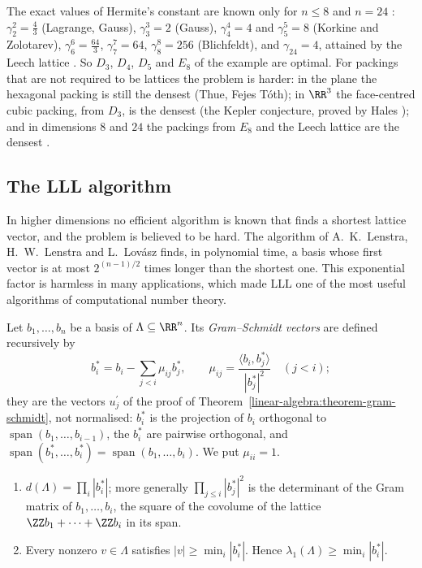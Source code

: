 \begin{remark}\label{geometry-of-numbers:remark-hermite-values}
The exact values of Hermite's constant are known only for $n \leq 8$ and $n = 24$ \cite{conway-sloane}: $\gamma_2^2 = \frac43$ (Lagrange, Gauss), $\gamma_3^3 = 2$ (Gauss), $\gamma_4^4 = 4$ and
$\gamma_5^5 = 8$ (Korkine and Zolotarev), $\gamma_6^6 = \frac{64}{3}$, $\gamma_7^7 = 64$, $\gamma_8^8 = 256$ (Blichfeldt), and $\gamma_{24} = 4$, attained by the Leech lattice \cite{cohn-kumar-leech}.
So $D_3$, $D_4$, $D_5$ and $E_8$ of the example are optimal. For packings that are not required to be lattices the problem is harder: in the plane the hexagonal packing is still the densest (Thue,
Fejes T\'oth); in $\RR^3$ the face-centred cubic packing, from $D_3$, is the densest (the Kepler conjecture, proved by Hales \cite{hales-kepler}); and in dimensions $8$ and $24$ the packings from
$E_8$ and the Leech lattice are the densest \cite{viazovska-8, ckmrv-24}.
\end{remark}

\subsection{The LLL algorithm}\label{geometry-of-numbers:subsection-lll}

In higher dimensions no efficient algorithm is known that finds a shortest lattice vector, and the problem is believed to be hard. The algorithm of A.\ K.\ Lenstra, H.\ W.\ Lenstra and L.\ Lov\'asz
\cite{lll-1982} finds, in polynomial time, a basis whose first vector is at most $2^{(n-1)/2}$ times longer than the shortest one. This exponential factor is harmless in many applications, which made
LLL one of the most useful algorithms of computational number theory.

Let $b_1, \ldots, b_n$ be a basis of $\Lambda \subseteq \RR^n$. Its \emph{Gram--Schmidt vectors} are defined recursively by
\[
b_i^* = b_i - \sum_{j < i}\mu_{ij}b_j^*, \qquad \mu_{ij} = \frac{\langle b_i, b_j^* \rangle}{|b_j^*|^2} \quad (j < i);
\]
they are the vectors $u_j^{\prime}$ of the proof of Theorem~\ref{linear-algebra:theorem-gram-schmidt}, not normalised: $b_i^*$ is the projection of $b_i$ orthogonal to
$\operatorname{span}(b_1, \ldots, b_{i-1})$, the $b_i^*$ are pairwise orthogonal, and $\operatorname{span}(b_1^*, \ldots, b_i^*) = \operatorname{span}(b_1, \ldots, b_i)$. We put $\mu_{ii} = 1$.

\begin{lemma}\label{geometry-of-numbers:lemma-gram-schmidt}
\begin{enumerate}
\item $d(\Lambda) = \prod_i|b_i^*|$; more generally $\prod_{j \leq i}|b_j^*|^2$ is the determinant of the Gram matrix of $b_1, \ldots, b_i$, the square of the covolume of the lattice
$\ZZ b_1 + \cdots + \ZZ b_i$ in its span.
\item Every nonzero $v \in \Lambda$ satisfies $|v| \geq \min_i|b_i^*|$. Hence $\lambda_1(\Lambda) \geq \min_i|b_i^*|$.
\end{enumerate}
\end{lemma}

